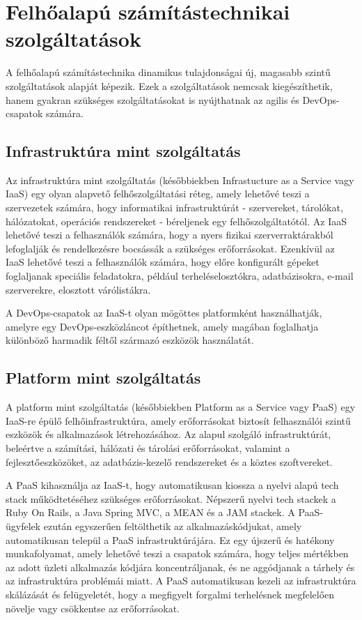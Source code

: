 \section{Felhőalapú számítástechnikai szolgáltatások}
A felhőalapú számítástechnika dinamikus tulajdonságai új, magasabb szintű szolgáltatások alapját képezik. Ezek a szolgáltatások nemcsak kiegészíthetik, hanem gyakran szükséges szolgáltatásokat is nyújthatnak az agilis és DevOps-csapatok számára.
\cite{cloudComp}

\subsection{Infrastruktúra mint szolgáltatás}
Az infrastruktúra mint szolgáltatás (későbbiekben Infrastucture as a Service vagy IaaS) egy olyan alapvető felhőszolgáltatási réteg, amely lehetővé teszi a szervezetek számára, hogy informatikai infrastruktúrát - szervereket, tárolókat, hálózatokat, operációs rendszereket - béreljenek egy felhőszolgáltatótól. Az IaaS lehetővé teszi a felhasználók számára, hogy a nyers fizikai szerverraktárakból lefoglalják és rendelkezésre bocsássák a szükséges erőforrásokat. Ezenkívül az IaaS lehetővé teszi a felhasználók számára, hogy előre konfigurált gépeket foglaljanak speciális feladatokra, például terheléselosztókra, adatbázisokra, e-mail szerverekre, elosztott várólistákra.

A DevOps-csapatok az IaaS-t olyan mögöttes platformként használhatják, amelyre egy DevOps-eszközláncot építhetnek, amely magában foglalhatja különböző harmadik féltől származó eszközök használatát.
\cite{cloudComp}

\subsection{Platform mint szolgáltatás}
A platform mint szolgáltatás (későbbiekben Platform as a Service vagy PaaS) egy IaaS-re épülő felhőinfrastruktúra, amely erőforrásokat biztosít felhasználói szintű eszközök és alkalmazások létrehozásához. Az alapul szolgáló infrastruktúrát, beleértve a számítási, hálózati és tárolási erőforrásokat, valamint a fejlesztőeszközöket, az adatbázis-kezelő rendszereket és a köztes szoftvereket.

A PaaS kihasználja az IaaS-t, hogy automatikusan kiossza a nyelvi alapú tech stack működtetéséhez szükséges erőforrásokat. Népszerű nyelvi tech stackek a Ruby On Rails, a Java Spring MVC, a MEAN és a JAM stackek. A PaaS-ügyfelek ezután egyszerűen feltölthetik az alkalmazáskódjukat, amely automatikusan települ a PaaS infrastruktúrájára. Ez egy újszerű és hatékony munkafolyamat, amely lehetővé teszi a csapatok számára, hogy teljes mértékben az adott üzleti alkalmazás kódjára koncentráljanak, és ne aggódjanak a tárhely és az infrastruktúra problémái miatt. A PaaS automatikusan kezeli az infrastruktúra skálázását és felügyeletét, hogy a megfigyelt forgalmi terhelésnek megfelelően növelje vagy csökkentse az erőforrásokat.
\cite{cloudComp}


